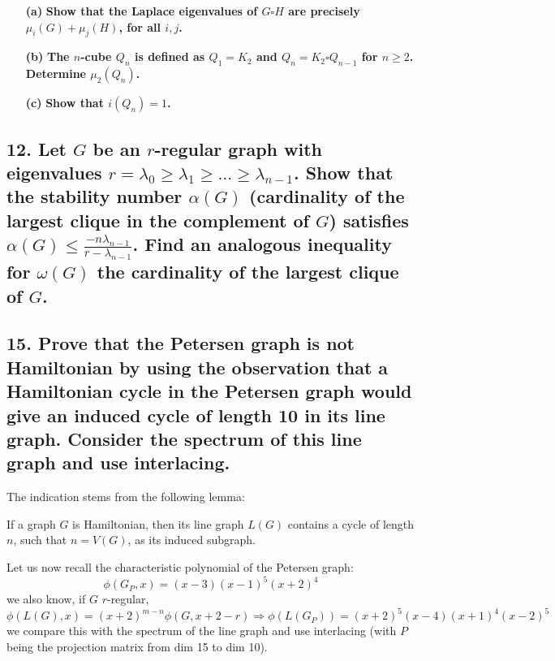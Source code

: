 \begin{enumerate}
    \item[\textbf{(a)}] \textbf{Show that the Laplace eigenvalues of $G\square H$ are precisely $\mu_i(G) + \mu_j(H)$, for all $i, j$.}
    \item[\textbf{(b)}] \textbf{The $n$-cube $Q_n$ is defined as $Q_1 = K_2$ and $Q_n = K_2 \square Q_{n-1}$ for $n \geq 2$. Determine $\mu_2(Q_n)$.}
    \item[\textbf{(c)}] \textbf{Show that $i(Q_n) = 1$.}
\end{enumerate}

\subsection[Laplacian - 12]{12. Let $G$ be an $r$-regular graph with eigenvalues $r = \lambda_0 \geq \lambda_1 \geq \dots \geq \lambda_{n-1}$. Show that the stability number $\alpha(G)$ (cardinality of the largest clique in the complement of $G$) satisfies $\alpha(G) \leq \frac{-n \lambda_{n-1}}{r - \lambda_{n-1}}$. Find an analogous inequality for $\omega(G)$ the cardinality of the largest clique of $G$.}

\subsection[Laplacian - 15]{15. Prove that the Petersen graph is not Hamiltonian by using the observation that a Hamiltonian cycle in the Petersen graph would give an induced cycle of length 10 in its line graph. Consider the spectrum of this line graph and use interlacing.}

The indication stems from the following lemma:
\begin{lemma}
    If a graph $G$ is Hamiltonian, then its line graph $L(G)$ contains a cycle of length $n$, such that $n = V(G)$, as its induced subgraph.
\end{lemma}
Let us now recall the characteristic polynomial of the Petersen graph:
$$\phi(G_P, x) = (x-3)(x-1)^5(x+2)^4$$
we also know, if $G$ $r$-regular,
$$\phi(L(G), x) = (x+2)^{m-n} \phi(G, x + 2 - r) \Rightarrow \phi(L(G_P)) = (x+2)^5(x-4)(x+1)^4(x-2)^5$$
we compare this with the spectrum of the line graph and use interlacing (with $P$ being the projection matrix from dim 15 to dim 10).
